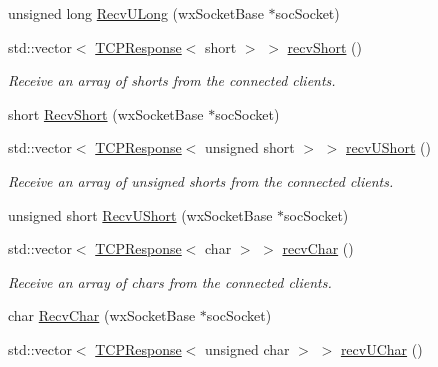 \begin{DoxyCompactItemize}
unsigned long \hyperlink{class_rad_jav_1_1_networking_1_1wx_widgets_t_c_p_server_a09f9ce320e74d8f71291ce9ba12e3a90}{Recv\+U\+Long} (wx\+Socket\+Base $\ast$soc\+Socket)
\item 
std\+::vector$<$ \hyperlink{class_rad_jav_1_1_networking_1_1_t_c_p_response}{T\+C\+P\+Response}$<$ short $>$ $>$ \hyperlink{class_rad_jav_1_1_networking_1_1wx_widgets_t_c_p_server_af9257f7a57de0dc209093d8f5f24a085}{recv\+Short} ()
\begin{DoxyCompactList}\small\item\em Receive an array of shorts from the connected clients. \end{DoxyCompactList}\item 
short \hyperlink{class_rad_jav_1_1_networking_1_1wx_widgets_t_c_p_server_a8f878720e1bd45e7e18ccb3648493529}{Recv\+Short} (wx\+Socket\+Base $\ast$soc\+Socket)
\item 
std\+::vector$<$ \hyperlink{class_rad_jav_1_1_networking_1_1_t_c_p_response}{T\+C\+P\+Response}$<$ unsigned short $>$ $>$ \hyperlink{class_rad_jav_1_1_networking_1_1wx_widgets_t_c_p_server_a0def0d22b0704e747c23ab86a92cb7f6}{recv\+U\+Short} ()
\begin{DoxyCompactList}\small\item\em Receive an array of unsigned shorts from the connected clients. \end{DoxyCompactList}\item 
unsigned short \hyperlink{class_rad_jav_1_1_networking_1_1wx_widgets_t_c_p_server_aa8b69afaa21f70a232c4006ed0b89bb1}{Recv\+U\+Short} (wx\+Socket\+Base $\ast$soc\+Socket)
\item 
std\+::vector$<$ \hyperlink{class_rad_jav_1_1_networking_1_1_t_c_p_response}{T\+C\+P\+Response}$<$ char $>$ $>$ \hyperlink{class_rad_jav_1_1_networking_1_1wx_widgets_t_c_p_server_a187fd5986bb090660fcdbdb515bbe76a}{recv\+Char} ()
\begin{DoxyCompactList}\small\item\em Receive an array of chars from the connected clients. \end{DoxyCompactList}\item 
char \hyperlink{class_rad_jav_1_1_networking_1_1wx_widgets_t_c_p_server_a7c8f3647451583f585b9a367ae9d7f5c}{Recv\+Char} (wx\+Socket\+Base $\ast$soc\+Socket)
\item 
std\+::vector$<$ \hyperlink{class_rad_jav_1_1_networking_1_1_t_c_p_response}{T\+C\+P\+Response}$<$ unsigned char $>$ $>$ \hyperlink{class_rad_jav_1_1_networking_1_1wx_widgets_t_c_p_server_ac742b28c6d58d0495492e321f8f0960f}{recv\+U\+Char} ()

\end{DoxyCompactItemize}
